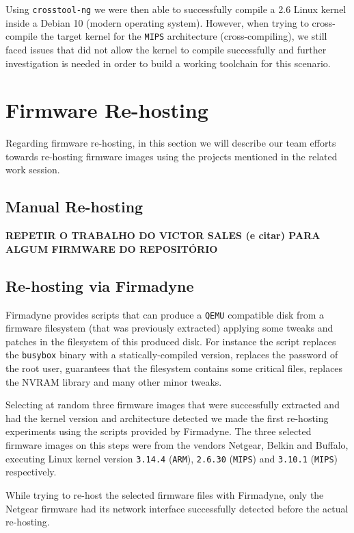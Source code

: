 Using {\tt crosstool-ng} we were then able to successfully compile a 2.6 Linux kernel inside a Debian 10 (modern operating system). However, when trying to cross-compile the target kernel for the {\tt MIPS} architecture (cross-compiling), we still faced issues that did not allow the kernel to compile successfully and further investigation is needed in order to build a working toolchain for this scenario.

\section{Firmware Re-hosting}

Regarding firmware re-hosting, in this section we will describe our team efforts towards re-hosting firmware images using the projects mentioned in the related work session.

\subsection{Manual Re-hosting}

\textbf{REPETIR O TRABALHO DO VICTOR SALES (e citar) PARA ALGUM FIRMWARE DO REPOSITÓRIO}

\subsection{Re-hosting via Firmadyne}

Firmadyne provides scripts that can produce a {\tt QEMU} compatible disk from a firmware filesystem (that was previously extracted) applying some tweaks and patches in the filesystem of this produced disk. For instance the script replaces the {\tt busybox} binary with a statically-compiled version, replaces the password of the root user, guarantees that the filesystem contains some critical files, replaces the NVRAM library and many other minor tweaks.

Selecting at random three firmware images that were successfully extracted and had the kernel version and architecture detected we made the first re-hosting experiments using the scripts provided by Firmadyne. The three selected firmware images on this steps were from the vendors Netgear, Belkin and Buffalo, executing Linux kernel version {\tt 3.14.4} ({\tt ARM}), {\tt 2.6.30} ({\tt MIPS}) and {\tt 3.10.1} ({\tt MIPS}) respectively.

While trying to re-host the selected firmware files with Firmadyne, only the Netgear firmware had its network interface successfully detected before the actual re-hosting.

